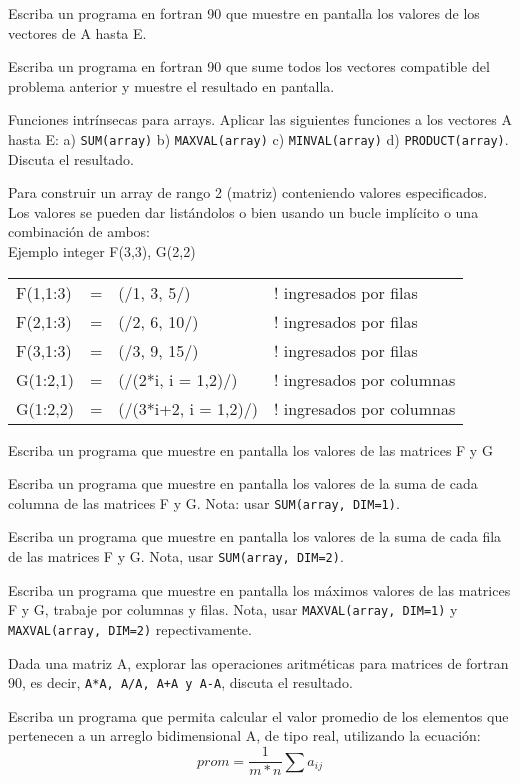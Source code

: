 \documentclass[11pt]{exam}
\begin{document}
\begin{questions}
 \item 
Escriba un programa en  fortran 90 que muestre en pantalla los valores de los vectores de A hasta E.
\item 
Escriba un programa en  fortran 90 que sume todos los vectores compatible del problema anterior y muestre el resultado en pantalla.
\item 
Funciones intr\'insecas para arrays. Aplicar las siguientes funciones a los vectores A hasta E:  a) \texttt{SUM(array)} b) \texttt{MAXVAL(array)} c) \texttt{MINVAL(array)} d) \texttt{PRODUCT(array)}. Discuta el resultado.

Para  construir un array de rango 2 (matriz) conteniendo valores especificados. Los valores se pueden dar list\'andolos o bien usando un bucle impl\'icito o una combinaci\'on de ambos:\\
Ejemplo  integer F(3,3), G(2,2)

\begin{tabular}{llll}
F(1,1:3)& =& (/1, 3, 5/)    	&! ingresados por filas\\
F(2,1:3)& = &(/2, 6, 10/) 	&! ingresados por filas\\
F(3,1:3)& = &(/3, 9, 15/)	&! ingresados por filas\\
G(1:2,1)& = &(/(2*i, i = 1,2)/)  &! ingresados por columnas\\
G(1:2,2)& = &(/(3*i+2, i = 1,2)/)&! ingresados por columnas\\
\end{tabular}
\item 
Escriba un programa que muestre en pantalla los valores de las matrices F y G
\item 
Escriba un programa que muestre en pantalla los valores de la suma de cada columna de las matrices F y G. Nota: usar \texttt{SUM(array, DIM=1)}.
\item 
Escriba un programa que muestre en pantalla los valores de la suma de cada fila de las matrices F y G. Nota, usar \texttt{SUM(array, DIM=2)}.
\item 
Escriba un programa que muestre en pantalla los m\'aximos valores de las matrices F y G, trabaje por columnas y filas. Nota, usar \texttt{MAXVAL(array, DIM=1)} y \texttt{MAXVAL(array, DIM=2)} repectivamente.
\item 
Dada una matriz A, explorar las operaciones aritm\'eticas para matrices de fortran 90, es decir, \texttt{A*A, A/A, A+A y A-A}, discuta el resultado.
\item 
Escriba un programa     que permita calcular el valor promedio de los elementos que pertenecen a un arreglo bidimensional A, de tipo real, utilizando la ecuaci\'on:
$$prom=\dfrac{1}{m*n}\sum a_{ij}$$
\\


\end{questions}
\end{document}
